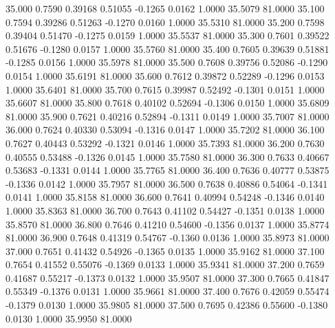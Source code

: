   35.000   0.7590   0.39168   0.51055  -0.1265   0.0162   1.0000  35.5079  81.0000
  35.100   0.7594   0.39286   0.51263  -0.1270   0.0160   1.0000  35.5310  81.0000
  35.200   0.7598   0.39404   0.51470  -0.1275   0.0159   1.0000  35.5537  81.0000
  35.300   0.7601   0.39522   0.51676  -0.1280   0.0157   1.0000  35.5760  81.0000
  35.400   0.7605   0.39639   0.51881  -0.1285   0.0156   1.0000  35.5978  81.0000
  35.500   0.7608   0.39756   0.52086  -0.1290   0.0154   1.0000  35.6191  81.0000
  35.600   0.7612   0.39872   0.52289  -0.1296   0.0153   1.0000  35.6401  81.0000
  35.700   0.7615   0.39987   0.52492  -0.1301   0.0151   1.0000  35.6607  81.0000
  35.800   0.7618   0.40102   0.52694  -0.1306   0.0150   1.0000  35.6809  81.0000
  35.900   0.7621   0.40216   0.52894  -0.1311   0.0149   1.0000  35.7007  81.0000
  36.000   0.7624   0.40330   0.53094  -0.1316   0.0147   1.0000  35.7202  81.0000
  36.100   0.7627   0.40443   0.53292  -0.1321   0.0146   1.0000  35.7393  81.0000
  36.200   0.7630   0.40555   0.53488  -0.1326   0.0145   1.0000  35.7580  81.0000
  36.300   0.7633   0.40667   0.53683  -0.1331   0.0144   1.0000  35.7765  81.0000
  36.400   0.7636   0.40777   0.53875  -0.1336   0.0142   1.0000  35.7957  81.0000
  36.500   0.7638   0.40886   0.54064  -0.1341   0.0141   1.0000  35.8158  81.0000
  36.600   0.7641   0.40994   0.54248  -0.1346   0.0140   1.0000  35.8363  81.0000
  36.700   0.7643   0.41102   0.54427  -0.1351   0.0138   1.0000  35.8570  81.0000
  36.800   0.7646   0.41210   0.54600  -0.1356   0.0137   1.0000  35.8774  81.0000
  36.900   0.7648   0.41319   0.54767  -0.1360   0.0136   1.0000  35.8973  81.0000
  37.000   0.7651   0.41432   0.54926  -0.1365   0.0135   1.0000  35.9162  81.0000
  37.100   0.7654   0.41552   0.55076  -0.1369   0.0133   1.0000  35.9341  81.0000
  37.200   0.7659   0.41687   0.55217  -0.1373   0.0132   1.0000  35.9507  81.0000
  37.300   0.7665   0.41847   0.55349  -0.1376   0.0131   1.0000  35.9661  81.0000
  37.400   0.7676   0.42059   0.55474  -0.1379   0.0130   1.0000  35.9805  81.0000
  37.500   0.7695   0.42386   0.55600  -0.1380   0.0130   1.0000  35.9950  81.0000
